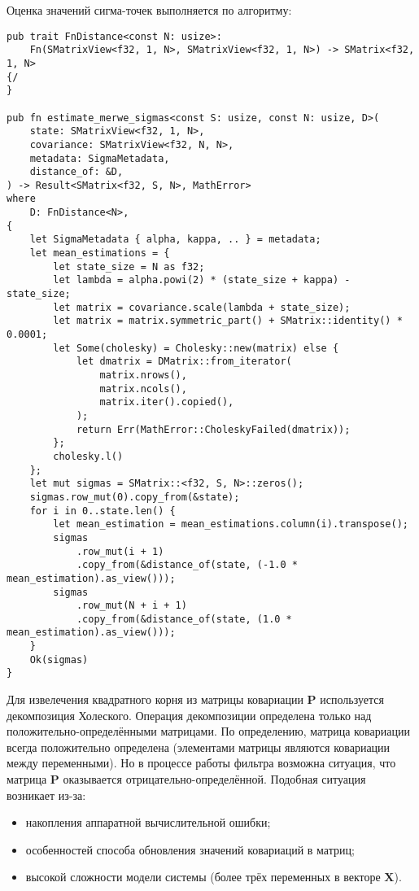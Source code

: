 Оценка значений сигма-точек выполняется по алгоритму:
\begin{lstlisting}
pub trait FnDistance<const N: usize>:
    Fn(SMatrixView<f32, 1, N>, SMatrixView<f32, 1, N>) -> SMatrix<f32, 1, N>
{/
}

pub fn estimate_merwe_sigmas<const S: usize, const N: usize, D>(
    state: SMatrixView<f32, 1, N>,
    covariance: SMatrixView<f32, N, N>,
    metadata: SigmaMetadata,
    distance_of: &D,
) -> Result<SMatrix<f32, S, N>, MathError>
where
    D: FnDistance<N>,
{
    let SigmaMetadata { alpha, kappa, .. } = metadata;
    let mean_estimations = {
        let state_size = N as f32;
        let lambda = alpha.powi(2) * (state_size + kappa) - state_size;
        let matrix = covariance.scale(lambda + state_size);
        let matrix = matrix.symmetric_part() + SMatrix::identity() * 0.0001;
        let Some(cholesky) = Cholesky::new(matrix) else {
            let dmatrix = DMatrix::from_iterator(
                matrix.nrows(),
                matrix.ncols(),
                matrix.iter().copied(),
            );
            return Err(MathError::CholeskyFailed(dmatrix));
        };
        cholesky.l()
    };
    let mut sigmas = SMatrix::<f32, S, N>::zeros();
    sigmas.row_mut(0).copy_from(&state);
    for i in 0..state.len() {
        let mean_estimation = mean_estimations.column(i).transpose();
        sigmas
            .row_mut(i + 1)
            .copy_from(&distance_of(state, (-1.0 * mean_estimation).as_view()));
        sigmas
            .row_mut(N + i + 1)
            .copy_from(&distance_of(state, (1.0 * mean_estimation).as_view()));
    }
    Ok(sigmas)
}

\end{lstlisting}
Для извелечения квадратного корня из матрицы ковариации $\mathbf{P}$
используется декомпозиция Холеского. Операция декомпозиции 
определена только над положительно-определёнными матрицами. По определению,
матрица ковариации всегда положительно определена (элементами матрицы являются ковариации
между переменными). Но в процессе работы фильтра возможна ситуация,
что матрица $\mathbf{P}$ оказывается отрицательно-определённой.
Подобная ситуация возникает из-за:
\begin{itemize}
    \item накопления аппаратной вычислительной ошибки;
    \item особенностей способа обновления значений ковариаций в матриц;
    \item высокой сложности модели системы (более трёх переменных в векторе $\mathbf{X}$).
\end{itemize}

